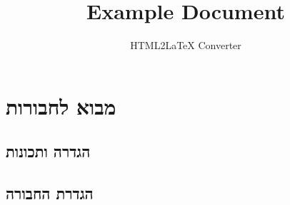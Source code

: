 \documentclass{tstextbook}
\begin{document}
\title{Example Document}
\author{HTML2LaTeX Converter}
\maketitle

\section{מבוא לחבורות}

\subsection{הגדרה ותכונות}

\subsection{הגדרת החבורה}
\end{document}
